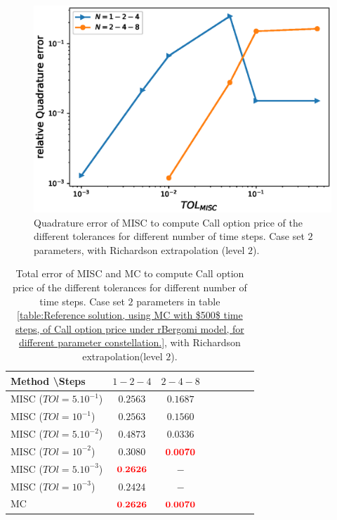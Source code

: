 \documentclass[11pt]{article}
\begin{document}
\begin{figure}[h!]
	\centering
	\includegraphics[width=0.7\linewidth]{./figures/rBergomi_MISC_quadratre_error/vs_TOL/set2/relative_quad_error_wrt_MISC_TOL_set2_rich_level2}
	
	
	\caption{Quadrature error of MISC to compute Call option price of the different tolerances for different number of time steps. Case  set $2$ parameters, with Richardson extrapolation (level $2$).}
	\label{fig:Quadrature_error_set2_rich_level2}
\end{figure}
		
\begin{table}[!h]
	\centering
	\begin{tabular}{l*{6}{c}r}
		Method \textbackslash  Steps            & $1-2-4$ & $2-4-8$  \\
		\hline
		MISC ($TOl=5.10^{-1}$)  & $\mathbf{0.2563
		}$ & $\mathbf{ 0.1687}$  \\
		MISC ($TOl=10^{-1}$)  & $\mathbf{0.2563
		}$ & $\mathbf{ 0.1560}$ \\
		MISC ($TOl=5.10^{-2}$)  & $\mathbf{0.4873
		}$ & $\mathbf{ 0.0336 }$  \\
		MISC ($TOl=10^{-2}$)  & $\mathbf{0.3080}$ & $\mathbf{  {\color{red}0.0070}}$   \\	
		MISC ($TOl=5.10^{-3}$)  & $\mathbf{{\color{red}0.2626}}$ & $\mathbf{-}$   \\
		MISC ($TOl=10^{-3}$)  & $\mathbf{0.2424}$ & $\mathbf{-}$   \\
		\hline
		MC   & $\mathbf{{\color{red}0.2626}}$  & $\mathbf{{\color{red}0.0070}}$    \\
		\hline
	\end{tabular}
	\caption{Total  error of MISC and MC to compute Call option price of the different tolerances for different number of time steps. Case set $2$ parameters in table \ref{table:Reference solution, using MC with $500$ time steps, of Call option price under rBergomi model, for different parameter constellation.}, with Richardson extrapolation(level $2$).}
	\label{Total  error of MISC and MC to compute Call option price of the different tolerances for different number of time steps. Case set $2$ parameters, with Richardson extrapolation(level $2$). The numbers between parentheses are the corresponding absolute errors}
\end{table}
\end{document}
